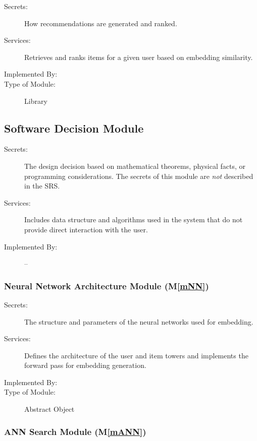 \documentclass[12pt, titlepage]{article}
\newcommand{\mref}[1]{M\ref{#1}}
\begin{document}
\begin{description}
\item[Secrets:]How recommendations are generated and ranked.
\item[Services:]Retrieves and ranks items for a given user based on embedding similarity.
\item[Implemented By:] \progname
\item[Type of Module:] Library
\end{description}


\subsection{Software Decision Module}

\begin{description}
\item[Secrets:] The design decision based on mathematical theorems, physical
  facts, or programming considerations. The secrets of this module are
  \emph{not} described in the SRS.
\item[Services:] Includes data structure and algorithms used in the system that
  do not provide direct interaction with the user. 
\item[Implemented By:] --
\end{description}

\subsubsection{Neural Network Architecture Module (\mref{mNN})}

\begin{description}
\item[Secrets:]The structure and parameters of the neural networks used for embedding.
\item[Services:]Defines the architecture of the user and item towers and implements the forward pass for embedding generation.
\item[Implemented By:] \progname
\item[Type of Module:] Abstract Object
\end{description}

\subsubsection{ANN Search Module (\mref{mANN})}
\end{document}
